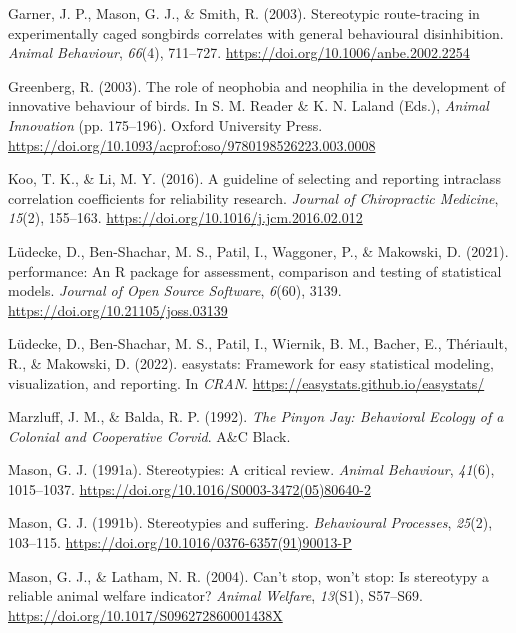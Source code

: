 \documentclass[
  pub]{apa6}
\newlength{\cslhangindent}
\newlength{\cslentryspacingunit} %
\newenvironment{CSLReferences}[2] %
 {%
  \setlength{\parindent}{0pt}
  \ifodd #1
  \let\oldpar\par
  \def\par{\hangindent=\cslhangindent\oldpar}
  \fi
  \setlength{\parskip}{#2\cslentryspacingunit}
 }%
 {}
\begin{document}
\begin{CSLReferences}{1}{0}
\leavevmode{}%
Garner, J. P., Mason, G. J., \& Smith, R. (2003). Stereotypic route-tracing in experimentally caged songbirds correlates with general behavioural disinhibition. \emph{Animal Behaviour}, \emph{66}(4), 711--727. \url{https://doi.org/10.1006/anbe.2002.2254}

\leavevmode{}%
Greenberg, R. (2003). The role of neophobia and neophilia in the development of innovative behaviour of birds. In S. M. Reader \& K. N. Laland (Eds.), \emph{Animal {Innovation}} (pp. 175--196). {Oxford University Press}. \url{https://doi.org/10.1093/acprof:oso/9780198526223.003.0008}

\leavevmode{}%
Koo, T. K., \& Li, M. Y. (2016). A guideline of selecting and reporting intraclass correlation coefficients for reliability research. \emph{Journal of Chiropractic Medicine}, \emph{15}(2), 155--163. \url{https://doi.org/10.1016/j.jcm.2016.02.012}

\leavevmode{}%
Lüdecke, D., Ben-Shachar, M. S., Patil, I., Waggoner, P., \& Makowski, D. (2021). {performance}: An {R} package for assessment, comparison and testing of statistical models. \emph{Journal of Open Source Software}, \emph{6}(60), 3139. \url{https://doi.org/10.21105/joss.03139}

\leavevmode{}%
Lüdecke, D., Ben-Shachar, M. S., Patil, I., Wiernik, B. M., Bacher, E., Thériault, R., \& Makowski, D. (2022). {easystats}: Framework for easy statistical modeling, visualization, and reporting. In \emph{CRAN}. \url{https://easystats.github.io/easystats/}

\leavevmode{}%
Marzluff, J. M., \& Balda, R. P. (1992). \emph{The {Pinyon Jay}: {Behavioral Ecology} of a {Colonial} and {Cooperative Corvid}}. {A\&C Black}.

\leavevmode{}%
Mason, G. J. (1991a). Stereotypies: A critical review. \emph{Animal Behaviour}, \emph{41}(6), 1015--1037. \url{https://doi.org/10.1016/S0003-3472(05)80640-2}

\leavevmode{}%
Mason, G. J. (1991b). Stereotypies and suffering. \emph{Behavioural Processes}, \emph{25}(2), 103--115. \url{https://doi.org/10.1016/0376-6357(91)90013-P}

\leavevmode{}%
Mason, G. J., \& Latham, N. R. (2004). Can't stop, won't stop: Is stereotypy a reliable animal welfare indicator? \emph{Animal Welfare}, \emph{13}(S1), S57--S69. \url{https://doi.org/10.1017/S096272860001438X}


\end{CSLReferences}
\end{document}
